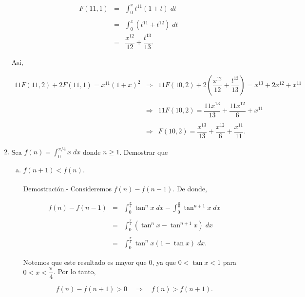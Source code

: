 \begin{enumerate}[\bfseries 1.]
	$$
	\begin{array}{rcl}
	    F(11,1) &=& \displaystyle\int_0^x t^{11}(1+t)\; dt\\\\
		    &=& \displaystyle\int_0^x \left(t^{11}+t^{12}\right)\; dt\\
		    &=& \dfrac{x^{12}}{12}+\dfrac{t^{13}}{13}.
	\end{array}
	$$

	Así,

	$$
	\begin{array}{rcl}
	    11F(11,2)+2F(11,1) = x^{11}(1+x)^2 &\Rightarrow& 11F(10,2)+2\left(\dfrac{x^{12}}{12}+\dfrac{t^{13}}{13}\right) = x^{13}+2x^{12}+x^{11}\\\\
					       &\Rightarrow& 11F(10,2)=\dfrac{11x^{13}}{13}+\dfrac{11x^{12}}{6}+x^{11}\\\\ 
					       &\Rightarrow& F(10,2)=\dfrac{x^{13}}{13}+\dfrac{x^{12}}{6}+\dfrac{x^{11}}{11}.
	\end{array}
	$$
	\vspace{.5cm}


    \item Sea $f(n)=\displaystyle\int_0^{\pi/4}x\; dx$ donde $n\geq 1$. Demostrar que

    \begin{enumerate}[(a)]

	\item $f(n+1)<f(n)$.\\\\
	    Demostración.-\; Consideremos $f(n)-f(n-1)$. De donde,

	    $$
	    \begin{array}{rcl}
		f(n)-f(n-1) &=& \displaystyle\int_0^{\frac{\pi}{4}} \tan^n x\; dx - \int_0^{\frac{\pi}{0}} \tan^{n+1}x\; dx\\\\
			    &=& \displaystyle\int_0^{\frac{\pi}{4}}\left(\tan^nx-\tan^{n+1}x\right)\; dx\\\\
			    &=& \displaystyle\int_0^{\frac{\pi}{4}} \tan^n x\left(1-\tan x\right)\; dx.
	    \end{array}
	    $$

	    Notemos que este resultado es mayor que $0$, ya que $0<\tan x<1$ para $0<x<\dfrac{\pi}{4}$. Por lo tanto,

	    $$f(n)-f(n+1)>0\quad \Rightarrow \quad f(n)>f(n+1).$$\\



\end{enumerate}
\end{enumerate}
